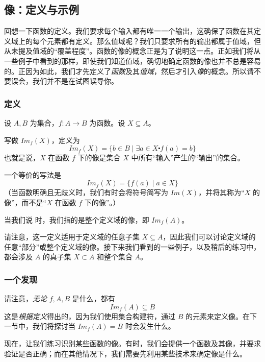 
\subsection{像：定义与示例}

回想一下函数的定义。我们要求每个输入都有唯一一个输出，这确保了函数在其定义域上的每个元素都有定义。那么值域呢？我们只要求所有的输出都属于值域，但从未提及值域的``覆盖程度''。函数的像的概念正是为了说明这一点。正如我们将从一些例子中看到的那样，即使我们知道值域，确切地确定函数的像也并不总是容易的。正因为如此，我们才先定义了\emph{函数}及其\emph{值域}，然后才引入\emph{像}的概念。所以请不要误会，我们并不是在试图误导你。

\subsubsection*{定义}

\begin{definition}
    设 $A, B$ 为集合，$f:A \to B$ 为函数。设 $X \subseteq A$。

     写做 $Im_f(X)$，定义为
    \[Im_f(X) = \{b \in B \mid \exists a \in X \centerdot f(a) = b\}\]
    也就是说，$X$ 在函数 $f$ 下的像是集合 $X$ 中所有``输入''产生的``输出''的集合。

    一个等价的写法是
    \[Im_f(X) = \{f(a) \mid a \in X\}\]
    （当函数明确且无歧义时，我们有时会将符号简写为 $Im(X)$，并将其称为``$X$ 的像''，而不是``$X$ 在函数 $f$ 下的像''。）

    当我们说 时，我们指的是整个定义域的像，即 $Im_f (A)$。
\end{definition}

请注意，这一定义适用于定义域的任意子集 $X \subseteq A$，因此我们可以讨论定义域的任意``部分''或整个定义域的像。接下来我们看到的一些例子，以及稍后的练习中，都会涉及 $A$ 的真子集 $X \subset A$ 和整个集合 $A$。

\subsubsection*{一个发现}

请注意，\emph{无论} $f,A, B$ 是什么，都有
\[Im_f(A) \subseteq B\]
这是\emph{根据定义}得出的，因为我们使用集合构建符，通过 $B$ 的元素来定义像。在下一节中，我们将探讨当 $Im_f(A) = B$ 时会发生什么。

现在，让我们练习识别某些函数的像。有时，我们会提供一个函数及其像，并要求验证是否正确；而在其他情况下，我们需要先利用某些技术来确定像是什么。

